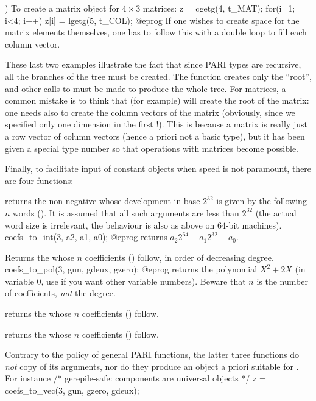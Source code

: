 ) To create a matrix object for $4\times 3$ matrices:
%
\bprog
  z = cgetg(4, t_MAT);
  for(i=1; i<4; i++) z[i] = lgetg(5, t_COL);
@eprog
%
\noindent If one wishes to create space for the matrix elements themselves,
one has to follow this with a double loop to fill each column vector.

These last two examples illustrate the fact that since PARI types are
recursive, all the branches of the tree must be created. The function
 creates only the ``root'', and other calls to  must be
made to produce the whole tree.  For matrices, a common mistake is to think
that  (for example) will create the root of the
matrix: one needs also to create the column vectors of the matrix (obviously,
since we specified only one dimension in the first !). This is
because a matrix is really just a row vector of column vectors (hence a
priori not a basic type), but it has been given a special type number so that
operations with matrices become possible.

Finally, to facilitate input of constant objects when speed is not paramount,
there are four  functions:

returns the non-negative  whose development in base $2^{32}$
is given by the following $n$ words (). It is assumed that
all such arguments are less than $2^{32}$ (the actual word size is
irrelevant, the behaviour is also as above on $64$-bit machines).
\bprog
  coefs_to_int(3, a2, a1, a0);
@eprog
\noindent returns $a_2 2^{64} + a_1 2^{32} + a_0$.

Returns the  whose $n$ coefficients () follow, in order of
decreasing degree.
\bprog
  coefs_to_pol(3, gun, gdeux, gzero);
@eprog
\noindent returns the polynomial $X^2 + 2X$ (in variable $0$, use
 if you want other variable numbers). Beware that $n$ is the
number of coefficients, \emph{not} the degree.

returns the  whose $n$ coefficients () follow.

returns the  whose $n$ coefficients () follow.

 Contrary to the policy of general PARI functions, the
latter three functions do \emph{not} copy of its arguments, nor do they produce
an object a priori suitable for . For instance
\bprog
  /* gerepile-safe: components are universal objects */
  z = coefs_to_vec(3, gun, gzero, gdeux);

